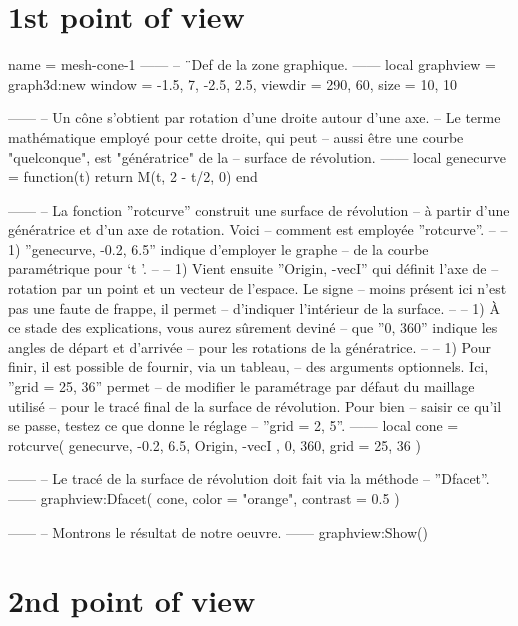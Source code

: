 \documentclass[varwidth]{standalone}
\begin{document}
\section*{1st point of view}

\begin{luadraw}{name = mesh-cone-1}
------
-- ¨Def de la zone graphique.
------
local graphview = graph3d:new{
  window  = {-1.5, 7, -2.5, 2.5},
  viewdir = {290, 60},
  size    = {10, 10}
}

------
-- Un cône s'obtient par rotation d'une droite autour d'une axe.
-- Le terme mathématique employé pour cette droite, qui peut
-- aussi être une courbe "quelconque", est "génératrice" de la
-- surface de révolution.
------
local genecurve = function(t)
  return M(t, 2 - t/2, 0)
end

------
-- La fonction ''rotcurve'' construit une surface de révolution
-- à partir d'une génératrice et d'un axe de rotation. Voici
-- comment est employée ''rotcurve''.
--
--     1) ''genecurve, -0.2, 6.5'' indique d'employer le graphe
--     de la courbe paramétrique pour `t \in [-0.2 .. 6.5]'.
--
--     1) Vient ensuite ''{Origin, -vecI}'' qui définit l'axe de
--     rotation par un point et un vecteur de l'espace. Le signe
--     moins présent ici n'est pas une faute de frappe, il permet
--     d'indiquer l'intérieur de la surface.
--
--     1) À ce stade des explications, vous aurez sûrement deviné
--     que ''0, 360'' indique les angles de départ et d'arrivée
--     pour les rotations de la génératrice.
--
--     1) Pour finir, il est possible de fournir, via un tableau,
--     des arguments optionnels. Ici, ''grid = {25, 36}'' permet
--     de modifier le paramétrage par défaut du maillage utilisé
--     pour le tracé final de la surface de révolution. Pour bien
--     saisir ce qu'il se passe, testez ce que donne le réglage
--     ''grid = {2, 5}''.
------
local cone = rotcurve(
  genecurve, -0.2, 6.5,
  {
    Origin, -vecI
  },
  0, 360,
  {
    grid = {25, 36}
  }
)

------
-- Le tracé de la surface de révolution doit fait via la méthode
-- ''Dfacet''.
------
graphview:Dfacet(
  cone,
  {
    color  = "orange",
    contrast = 0.5
  }
)

------
-- Montrons le résultat de notre oeuvre.
------
graphview:Show()
\end{luadraw}


\section*{2nd point of view}
\end{document}
